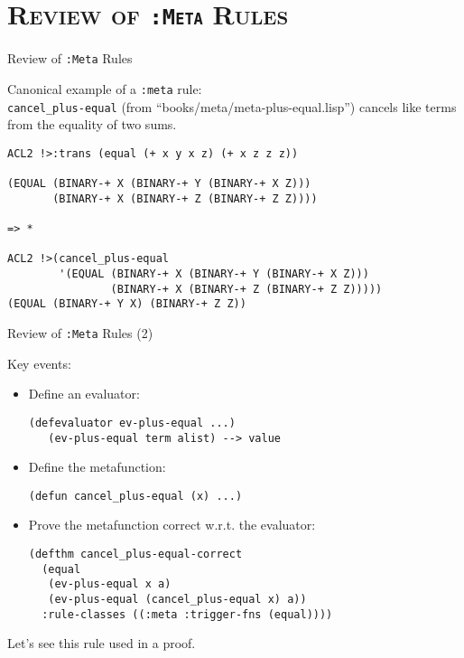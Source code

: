 \section[\scshape Review]{\scshape Review of {\tt :Meta} Rules}
\begin{frame}[fragile]{Review of {\tt :Meta} Rules}

Canonical example of a {\tt :meta} rule:\\
\verb|cancel_plus-equal| {\small (from ``books/meta/meta-plus-equal.lisp'')}
cancels like terms from the equality of two sums.

{\footnotesize
\begin{verbatim}
ACL2 !>:trans (equal (+ x y x z) (+ x z z z))

(EQUAL (BINARY-+ X (BINARY-+ Y (BINARY-+ X Z)))
       (BINARY-+ X (BINARY-+ Z (BINARY-+ Z Z))))

=> *

ACL2 !>(cancel_plus-equal
        '(EQUAL (BINARY-+ X (BINARY-+ Y (BINARY-+ X Z)))
                (BINARY-+ X (BINARY-+ Z (BINARY-+ Z Z)))))
(EQUAL (BINARY-+ Y X) (BINARY-+ Z Z))
\end{verbatim}
}

\end{frame}
\begin{frame}[fragile]{Review of {\tt :Meta} Rules (2)}

Key events:
\begin{itemize}
\item Define an evaluator:
\begin{verbatim}
(defevaluator ev-plus-equal ...)
   (ev-plus-equal term alist) --> value
\end{verbatim}
  
\item Define the metafunction:
\begin{verbatim}
(defun cancel_plus-equal (x) ...)
\end{verbatim}

\item Prove the metafunction correct w.r.t. the evaluator:
\begin{verbatim}
(defthm cancel_plus-equal-correct
  (equal
   (ev-plus-equal x a)
   (ev-plus-equal (cancel_plus-equal x) a))
  :rule-classes ((:meta :trigger-fns (equal))))
\end{verbatim}
\end{itemize}
Let's see this rule used in a proof.

\end{frame}
